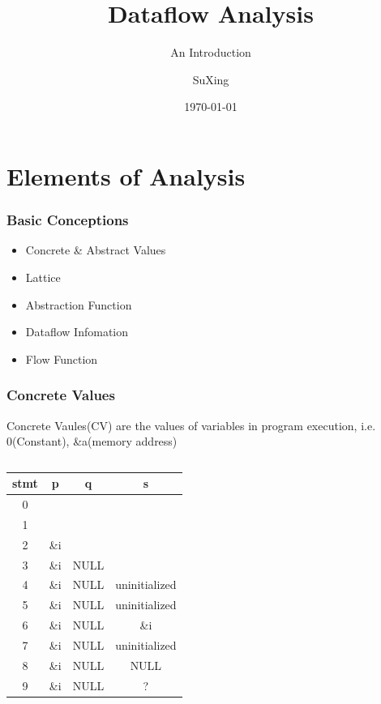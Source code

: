 \documentclass[]{beamer}
\title{Dataflow Analysis}
\subtitle{An Introduction}
\author[SuXing~pysuxing@gmail.com]{SuXing}
\institute{TOW}
\date{\today}
\begin{document}
\setlength{\parindent}{0pt}

\frame{\titlepage}
\frame{\tableofcontents}

\section{Elements of Analysis}
\frame{\tableofcontents[currentsection]}

\begin{frame}
  \frametitle{Basic Conceptions}
  \begin{itemize}
    \item Concrete \& Abstract Values
    \item Lattice
    \item Abstraction Function
    \item Dataflow Infomation
    \item Flow Function
  \end{itemize}
\end{frame}

\begin{frame}
  \frametitle{Concrete Values}
  \alert{Concrete Vaules(CV)} are the values of variables in program execution,
  i.e. 0(Constant), \&a(memory address)

  \vspace{.5em}\pause
  \begin{columns}
    \begin{column}{.65\textwidth}
      \begin{tabular}{c|ccc}
        stmt & p & q & s \\
        \hline
        0 & & & \\
        1 & & & \\
        2 & \&i & & \\
        3 & \&i & NULL & \\
        4 & \&i & NULL & uninitialized \\
        5 & \&i & NULL & uninitialized \\
        6 & \&i & NULL & \&i \\
        7 & \&i & NULL & uninitialized \\
        8 & \&i & NULL & NULL \\
        9 & \&i & NULL & ?
      \end{tabular}
    \end{column}
    \begin{column}{.35\textwidth}
      
    \end{column}
  \end{columns}
\end{frame}
\end{document}
